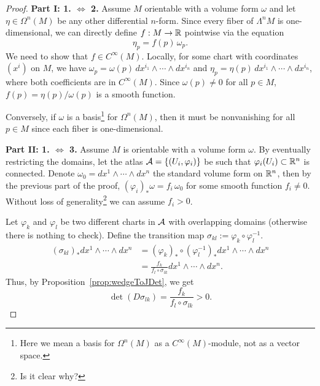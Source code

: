 \begin{proof}
	\textbf{Part I: 1. $\Leftrightarrow$ 2.}
	Assume $M$ orientable with a volume form $\omega$ and let $\eta\in\Omega^n(M)$ be any other differential $n$-form.
	Since every fiber of $\Lambda^n M$ is one-dimensional, we can directly define $f:M \to \mathbb{R}$ pointwise via the equation
	\[
		\eta_p = f(p)\,\omega_p.
	\]
	We need to show that $f\in C^\infty(M)$.
	Locally, for some chart with coordinates $(x^i)$ on $M$, we have $\omega_p = \omega(p)\, dx^{i_1}\wedge\cdots\wedge dx^{i_n}$ and $\eta_p = \eta(p)\, dx^{i_1}\wedge\cdots\wedge dx^{i_n}$, where both coefficients are in  $C^\infty(M)$.
	Since $\omega(p) \neq 0$ for all $p\in M$, $f(p) = \eta(p)/\omega(p)$ is a smooth function.

	Conversely, if $\omega$ is a basis\footnote{Here we mean a basis for $\Omega^n(M)$ as a $C^\infty(M)$-module, not as a vector space.} for $\Omega^n(M)$, then it must be nonvanishing for all $p\in M$ since each fiber is one-dimensional.
	\medskip

	\textbf{Part II: 1. $\Leftrightarrow$ 3.}
	Assume $M$ is orientable with a volume form $\omega$.
	By eventually restricting the domains, let the atlas $\mathcal{A} = \{(U_i, \varphi_i)\}$ be such that $\varphi_i(U_i) \subset \mathbb{R}^n$ is connected.
	Denote $\omega_0 = dx^1 \wedge\cdots\wedge dx^n$ the standard volume form on $\mathbb{R}^n$, then by the previous part of the proof, $(\varphi_i)_*\omega = f_i\,\omega_0$ for some smooth function $f_i \neq 0$.
	Without loss of generality\footnote{Is it clear why?} we can assume $f_i > 0$.

	Let $\varphi_k$ and $\varphi_l$ be two different charts in $\mathcal{A}$ with overlapping domains (otherwise there is nothing to check).
	Define the transition map $\sigma_{kl} := \varphi_k\circ\varphi_l^{-1}$.
	\begin{align}
		(\sigma_{kl})_* dx^1\wedge\cdots\wedge dx^n & = (\varphi_k)_* \circ (\varphi_l^{-1})_* dx^1\wedge \cdots\wedge dx^n \\
		                                            & = \frac{f_k}{f_l \circ \sigma_{lk}} dx^1\wedge \cdots\wedge dx^n.
	\end{align}
	Thus, by Proposition~\ref{prop:wedgeToJDet}, we get
	\begin{equation}
		\det(D\sigma_{lk}) = \frac{f_k}{f_l \circ \sigma_{lk}} > 0.
	\end{equation}


\end{proof}
